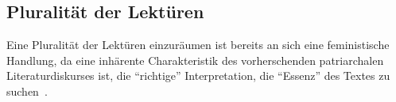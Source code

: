 \begin{comment}
  [Kolodny1980]
  feministische literaturkritik wird anscheinend zur sau gemacht, weil sie kein system/program hat: "lack of systematic coherence"
  das ist auch gleichzeitig die stärke der bewegung: diversity, pluralism
  ``All the feminist is asserting, then, is her own equivalent
  right to liberate new (and perhaps different) significances from
  these same texts; and, at the same time, her right to choose which
  features of a text she takes as relevant because she is, after all, ask-
  ing new and different questions of it.''~\cite{Kolodny1980}
  ``Robert Scholes, from whom I've been quoting, goes so far as to assert
  that "there is no single 'right' reading for any complex literary
  work,"''

Feministische Kritik stellt uns folgende Fragen:
- how are aesthetic values assigned
- do they reside with the reader or the text?
- what ends do the judgements serve?
- what value systems do they help perpetuate?

"What unites and repeatedly invigorates feminist literary criti-
cism, then, is neither dogma nor method but, as I have indicated
earlier, an acute and impassioned attentiveness to the ways in
which primarily male structures of power are inscribed (or en-
coded) within our literary inheritance; the consequences of that
encoding for women-as characters, as readers, and as writers;
and, with that, a shared analytic concern for the implications of
that encoding not only for a better understanding of the past, but
also for an improved reordering of the present and future as well."
-> Das ist meine Perspektive für die "feministischen Lektüren"

feminist criticism very quickly moved
beyond merely "expos[ing] sexism in one work of literature after
another"\cite{Kolodny1980}
--> Tu ich das? Merely exposing sexism in one work of literature? Ist es ok? mach ich vlt sonst was anderes?
\end{comment}


\subsection{Pluralität der Lektüren}

Eine Pluralität der Lektüren einzuräumen ist bereits an sich eine feministische Handlung,
da eine inhärente Charakteristik des vorherschenden patriarchalen Literaturdiskurses ist, die ``richtige'' Interpretation, die ``Essenz'' des Textes zu suchen~\cite{Kolodny1980}.

